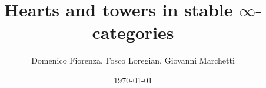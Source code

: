 \title{Hearts and towers in stable $\infty$-categories}
\author{Domenico Fiorenza, Fosco Loregian, Giovanni Marchetti}
\address{%
Domenico Fiorenza: Dipartimento di Matematica ``Guido Castelnuovo'',\newline 
Universit\`a degli Studi di Roma ``la Sapienza'',\newline	
P.le Aldo Moro 2 --  -- Roma. \newline
{}
}
\address{
Fosco Loregian: Department of Mathematics and Statistics\newline
Masaryk University, Faculty of Sciences\newline
Kotl\'{a}\v{r}sk\'{a} 2, 611 37 Brno, Czech Republic\newline
{}
}
\address{%
Giovanni Marchetti: Dipartimento di Matematica ``Guido Castelnuovo'',\newline
Universit\`a degli Studi di Roma ``la Sapienza'',\newline
P.le Aldo Moro 2 --  -- Roma.\newline
{}
}
\date{\today}
\maketitle